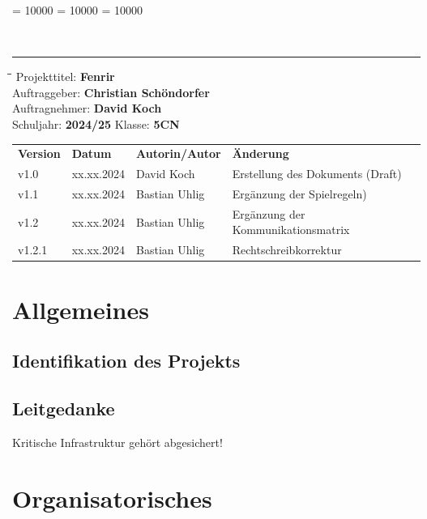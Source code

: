 \documentclass[
	headings=optiontotocandhead,%
	oneside,
	numbers=noenddot,%
	toc=flat, %
	10pt, %
	parskip=full, %
	listof=totoc, %
	listof=flat, %
	numbers=noenddot, %
	bibliography=totoc, %
	a4paper,DIV=14,
]{scrartcl}
\newcommand\Tstrut{\rule{0pt}{3.2ex}}         %
\newcommand\Bstrut{\rule[-1.5ex]{0pt}{0pt}}   %
\newenvironment{nstabbing}
	{\setlength{\topsep}{-\parskip}
		\setlength{\partopsep}{-\parskip}
		\tabbing}
	{\endtabbing}
\begin{document}
\clubpenalty = 10000 %
\widowpenalty = 10000 %
\displaywidowpenalty = 10000

{\sffamily{\textbf{\LARGE{\textcolor{orange}{Spielregeln}}}}}\\
\noindent\rule{\textwidth}{0.1pt}
\begin{nstabbing}
	\hspace{4cm}\=\hspace{4cm}\=\hspace{4cm}\=\kill
	Projekttitel: \> \textbf{Fenrir}\\
	Auftraggeber: \> \textbf{Christian Schöndorfer}\\
	Auftragnehmer: \> \textbf{David Koch}\\
	Schuljahr: \> \textbf{2024/25}
	\> Klasse: \> \textbf{5CN}\\
\end{nstabbing}
{\smaller
	\begin{tabularx}{\textwidth}{l l l l}
	\hline
	\textbf{Version} & \textbf{Datum} & \textbf{Autorin/Autor} & \textbf{Änderung}\Tstrut  \\
	v1.0 & xx.xx.2024 & David Koch & Erstellung des Dokuments (Draft)\Tstrut  \\
	v1.1 & xx.xx.2024 & Bastian Uhlig & Ergänzung der Spielregeln)\Tstrut  \\
	v1.2 & xx.xx.2024 & Bastian Uhlig & Ergänzung der Kommunikationsmatrix \\
	v1.2.1 & xx.xx.2024 & Bastian Uhlig & Rechtschreibkorrektur \Bstrut \\
	\hline
	\end{tabularx}
}

\section{Allgemeines}
\subsection{Identifikation des Projekts}
\blindtext
\subsection{Leitgedanke}
Kritische Infrastruktur gehört abgesichert!


\section{Organisatorisches}
\end{document}
